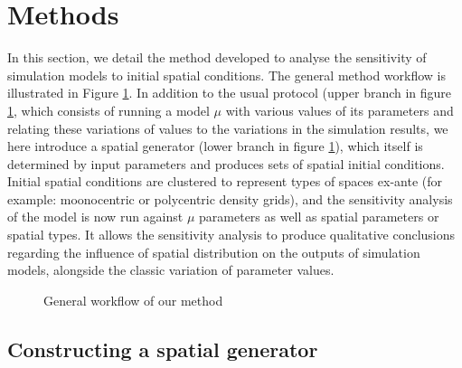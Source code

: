 \documentclass[Afour,sageh,times]{sagej}
\begin{document}
\section{Methods}

In this section, we detail the method developed to analyse the sensitivity of simulation models to initial spatial conditions. The general method workflow is illustrated in Figure \ref{fig:method}. In addition to the usual protocol (upper branch in figure \ref{fig:method}, which consists of running a model $\mu$ with various values of its parameters and relating these variations of values to the variations in the simulation results, we here introduce a spatial generator (lower branch in figure \ref{fig:method}), which itself is determined by input parameters and produces sets of spatial initial conditions. Initial spatial conditions are clustered to represent types of spaces ex-ante (for example: moonocentric or polycentric density grids), and the sensitivity analysis of the model is now run against $\mu$ parameters as well as spatial parameters or spatial types. It allows the sensitivity analysis to produce qualitative conclusions regarding the influence of spatial distribution on the outputs of simulation models, alongside the classic variation of parameter values.

\begin{figure}[htbp] \begin{center} 
 \caption{General workflow of our method} \label{fig:method} \end{center} \end{figure} %

\subsection{Constructing a spatial generator}
\end{document}

